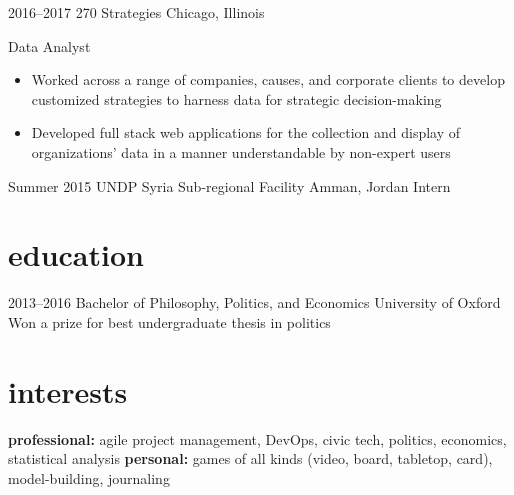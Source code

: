 \documentclass[letterpaper]{friggeri-cv} %
\begin{document}
\begin{entrylist}
\entry
{2016--2017}
{270 Strategies}
{Chicago, Illinois}
{{Data Analyst}
\begin{itemize}
\item Worked across a range of companies, causes, and corporate clients to develop customized strategies to harness data for strategic decision-making
\item Developed full stack web applications for the collection and display of organizations' data in a manner understandable by non-expert users
\end{itemize}}


\entry
{Summer 2015}
{UNDP Syria Sub-regional Facility}
{Amman, Jordan}
{Intern}

\end{entrylist}


\section{education}

\begin{entrylist}


\entry
{2013--2016}
{Bachelor {\normalfont of Philosophy, Politics, and Economics}}
{University of Oxford}
{Won a prize for best undergraduate thesis in politics}


\end{entrylist}


\section{interests}

\textbf{professional:} agile project management, DevOps, civic tech, politics, economics, statistical analysis \textbf{personal:} games of all kinds (video, board, tabletop, card), model-building, journaling

\end{document}
